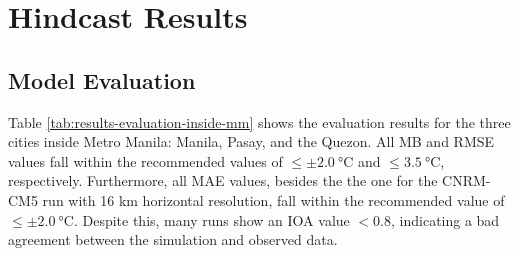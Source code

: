 \section{Hindcast Results}
	\subsection{Model Evaluation}
		Table \ref{tab:results-evaluation-inside-mm} shows the evaluation results for the three cities inside Metro Manila: Manila, Pasay, and the Quezon. 
		All MB and RMSE values fall within the recommended values of $\leq \pm \qty{2.0}{\degreeCelsius}$ and $\leq \qty{3.5}{\degreeCelsius}$, respectively.
		Furthermore, all MAE values, besides the the one for the CNRM-CM5 run with 16 km horizontal resolution, fall within the recommended value of $\leq \pm \qty{2.0}{\degreeCelsius}$.
		Despite this, many runs show an IOA value $< 0.8$, indicating a bad agreement between the simulation and observed data.
		
